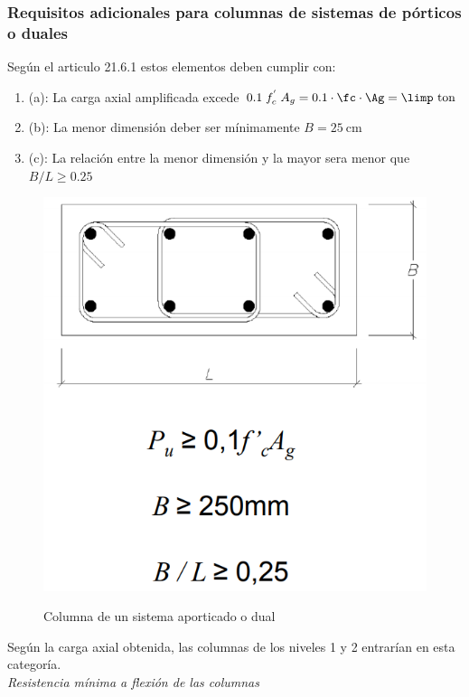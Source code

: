 \subsubsection{Requisitos adicionales para columnas de sistemas de pórticos o duales}
Según el articulo 21.6.1 estos elementos deben cumplir con:
\begin{enumerate}
\item[] (a): La carga axial amplificada excede $0.1\;f_{c}^{'}\;A_{g}=0.1\cdot\fc\cdot\Ag=\limp\mathrm{~ton}$
\item[] (b): La menor dimensión deber ser mínimamente $B=25 \mathrm{~cm}$
\item[] (c): La relación entre la menor dimensión y la mayor sera menor que $B/L\geq 0.25$
\end{enumerate}
\begin{figure}[hb!]
    \centering
    \caption{Columna de un sistema aporticado o dual}
    \includegraphics[trim={0 5.5cm 0 0},clip,scale=0.6]{IMAGENES/cc1.PNG}
    \label{vig}
\end{figure}
\newpage
\noindent
Según la carga axial obtenida, las columnas de los niveles 1 y 2 entrarían en esta categoría.\\
\textit{Resistencia mínima a flexión de las columnas}\\
